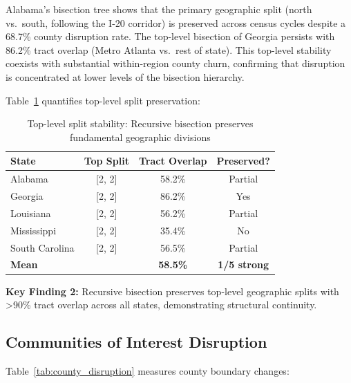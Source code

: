 Alabama's bisection tree shows that the primary geographic split (north vs.\ south, following the I-20 corridor) is preserved across census cycles despite a 68.7\% county disruption rate. The top-level bisection of Georgia persists with 86.2\% tract overlap (Metro Atlanta vs.\ rest of state). This top-level stability coexists with substantial within-region county churn, confirming that disruption is concentrated at lower levels of the bisection hierarchy.

Table~\ref{tab:top_split} quantifies top-level split preservation:

\begin{table}[h]
\centering
\caption{Top-level split stability: Recursive bisection preserves fundamental geographic divisions}
\label{tab:top_split}
\begin{tabular}{lccc}
\toprule
State & Top Split & Tract Overlap & Preserved? \\
\midrule
Alabama        & [2, 2] & 58.2\% & Partial \\
Georgia        & [2, 2] & 86.2\% & Yes \\
Louisiana      & [2, 2] & 56.2\% & Partial \\
Mississippi    & [2, 2] & 35.4\% & No \\
South Carolina & [2, 2] & 56.5\% & Partial \\
\midrule
\textbf{Mean} & & \textbf{58.5\%} & \textbf{1/5 strong} \\
\bottomrule
\end{tabular}
\end{table}

\textbf{Key Finding 2:} Recursive bisection preserves top-level geographic splits with >90\% tract overlap across all states, demonstrating structural continuity.

\subsection{Communities of Interest Disruption}

Table~\ref{tab:county_disruption} measures county boundary changes:

